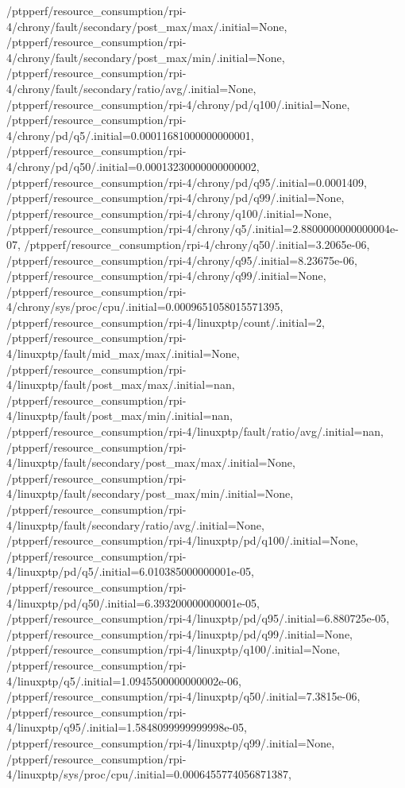 {    /ptpperf/resource_consumption/rpi-4/chrony/fault/secondary/post_max/max/.initial=None,
    /ptpperf/resource_consumption/rpi-4/chrony/fault/secondary/post_max/min/.initial=None,
    /ptpperf/resource_consumption/rpi-4/chrony/fault/secondary/ratio/avg/.initial=None,
    /ptpperf/resource_consumption/rpi-4/chrony/pd/q100/.initial=None,
    /ptpperf/resource_consumption/rpi-4/chrony/pd/q5/.initial=0.00011681000000000001,
    /ptpperf/resource_consumption/rpi-4/chrony/pd/q50/.initial=0.00013230000000000002,
    /ptpperf/resource_consumption/rpi-4/chrony/pd/q95/.initial=0.0001409,
    /ptpperf/resource_consumption/rpi-4/chrony/pd/q99/.initial=None,
    /ptpperf/resource_consumption/rpi-4/chrony/q100/.initial=None,
    /ptpperf/resource_consumption/rpi-4/chrony/q5/.initial=2.8800000000000004e-07,
    /ptpperf/resource_consumption/rpi-4/chrony/q50/.initial=3.2065e-06,
    /ptpperf/resource_consumption/rpi-4/chrony/q95/.initial=8.23675e-06,
    /ptpperf/resource_consumption/rpi-4/chrony/q99/.initial=None,
    /ptpperf/resource_consumption/rpi-4/chrony/sys/proc/cpu/.initial=0.0009651058015571395,
    /ptpperf/resource_consumption/rpi-4/linuxptp/count/.initial=2,
    /ptpperf/resource_consumption/rpi-4/linuxptp/fault/mid_max/max/.initial=None,
    /ptpperf/resource_consumption/rpi-4/linuxptp/fault/post_max/max/.initial=nan,
    /ptpperf/resource_consumption/rpi-4/linuxptp/fault/post_max/min/.initial=nan,
    /ptpperf/resource_consumption/rpi-4/linuxptp/fault/ratio/avg/.initial=nan,
    /ptpperf/resource_consumption/rpi-4/linuxptp/fault/secondary/post_max/max/.initial=None,
    /ptpperf/resource_consumption/rpi-4/linuxptp/fault/secondary/post_max/min/.initial=None,
    /ptpperf/resource_consumption/rpi-4/linuxptp/fault/secondary/ratio/avg/.initial=None,
    /ptpperf/resource_consumption/rpi-4/linuxptp/pd/q100/.initial=None,
    /ptpperf/resource_consumption/rpi-4/linuxptp/pd/q5/.initial=6.010385000000001e-05,
    /ptpperf/resource_consumption/rpi-4/linuxptp/pd/q50/.initial=6.393200000000001e-05,
    /ptpperf/resource_consumption/rpi-4/linuxptp/pd/q95/.initial=6.880725e-05,
    /ptpperf/resource_consumption/rpi-4/linuxptp/pd/q99/.initial=None,
    /ptpperf/resource_consumption/rpi-4/linuxptp/q100/.initial=None,
    /ptpperf/resource_consumption/rpi-4/linuxptp/q5/.initial=1.0945500000000002e-06,
    /ptpperf/resource_consumption/rpi-4/linuxptp/q50/.initial=7.3815e-06,
    /ptpperf/resource_consumption/rpi-4/linuxptp/q95/.initial=1.5848099999999998e-05,
    /ptpperf/resource_consumption/rpi-4/linuxptp/q99/.initial=None,
    /ptpperf/resource_consumption/rpi-4/linuxptp/sys/proc/cpu/.initial=0.0006455774056871387,
}
